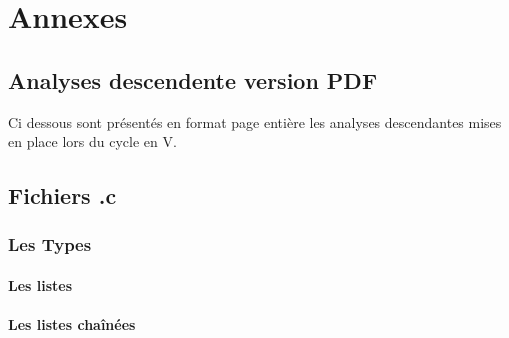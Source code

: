\chapter{Annexes}

\lstset{ 
    basicstyle=\ttfamily\small,
    breaklines=true, 
    frame=single, 
    xleftmargin=20pt,
    xrightmargin=20pt, 
}





\section{Analyses descendente version PDF} 
    Ci dessous sont présentés en format page entière les analyses descendantes mises en place lors du cycle en V.
     
     

\section{Fichiers .c}

    \subsection{Les Types}
        \subsubsection{Les listes}
            
            
            
            

        \subsubsection{Les listes chaînées}
            
            
            
            
            
            

